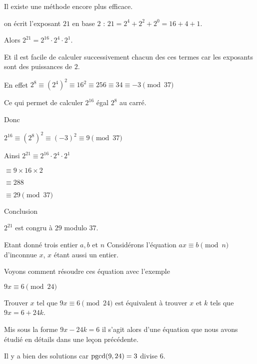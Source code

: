 Il existe une méthode encore plus efficace.

\change

on écrit l'exposant $21$ en base $2$ :
$21 = 2^{4} + 2^{2} + 2^{0} = 16 + 4 + 1$.

\change

 Alors
$2^{21} =  2^{16} \cdot 2^{4} \cdot 2^{1}$. 

Et il est facile de calculer successivement chacun des ces termes 
car les exposants sont des puissances de $2$. 


\change

En effet $2^8 \equiv  (2^4)^2 \equiv 16^2 \equiv 256 \equiv 34 \equiv -3 \pmod {37}$

\change

Ce qui permet de calculer $2^{16}$ égal $2^8$ au carré.

\change

Donc 

 $2^{16} \equiv  \left(2^{8}\right)^2 
\equiv (-3)^2 \equiv 9 \pmod{37}$


\change


Ainsi  $2^{21} \equiv  2^{16} \cdot 2^{4} \cdot 2^{1} $


\change

$ \equiv 9 \times 16 \times 2 $

\change


$\equiv 288$

\change

$\equiv 29 \pmod {37}$

Conclusion 

$2^{21}$ est congru à $29$ modulo $37$.


\diapo

Etant donné trois entier $a,b$ et $n$
Considérons l'équation 
$ax \equiv b \pmod n$ d'inconnue $x$, $x$ étant aussi un entier.

\change

Voyons comment résoudre ces équation avec l'exemple

$9x \equiv 6 \pmod{24}$

\change

Trouver $x$ tel que $9x \equiv 6 \pmod{24}$ est équivalent à trouver $x$ et $k$ tels que
$9x = 6 + 24k$. 

\change

Mis sous la forme $9x-24k=6$ il s'agit alors d'une équation que nous avons étudié en détails
dans une leçon précédente.

Il y a bien des solutions car $\mathop{\mathrm{pgcd}}\nolimits(9,24)=3$ divise $6$.

